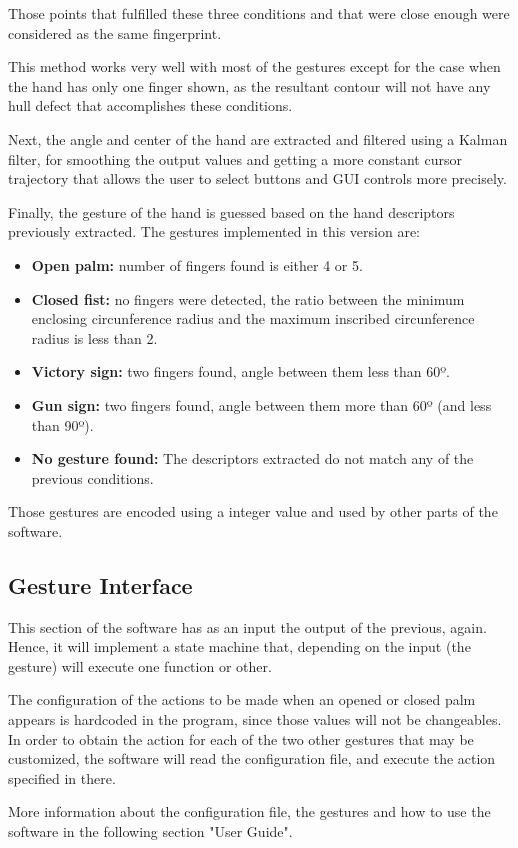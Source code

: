 Those points that fulfilled these three conditions and that were close enough were considered as the same fingerprint.

This method works very well with most of the gestures except for the case when the hand has only one finger shown, as the resultant contour will not have any hull defect that accomplishes these conditions.

Next, the angle and center of the hand are extracted and filtered using a Kalman filter, for smoothing the output values and getting a more constant cursor trajectory that allows the user to select buttons and GUI controls more precisely.

Finally, the gesture of the hand is guessed based on the hand descriptors previously extracted. The gestures implemented in this version are:

\begin{itemize}
\item {\bfseries Open palm:} number of fingers found is either 4 or 5.
\item {\bfseries Closed fist:} no fingers were detected, the ratio between the minimum enclosing circunference radius and the maximum inscribed circunference radius is less than 2.
\item {\bfseries Victory sign:} two fingers found, angle between them less than 60º.
\item {\bfseries Gun sign:} two fingers found, angle between them more than 60º (and less than 90º).
\item {\bfseries No gesture found:} The descriptors extracted do not match any of the previous conditions.
\end{itemize}

Those gestures are encoded using a integer value and used by other parts of the software.


\subsection{Gesture Interface} 
This section of the software has as an input the output of the previous, again. Hence, it will implement a state machine that, depending on the input (the gesture) will execute one function or other. 

\begin{center}
\end{center}

The configuration of the actions to be made when an opened or closed palm appears is hardcoded in the program, since those values will not be changeables. In order to obtain the action for each of the two other gestures that may be customized, the software will read the configuration file, and execute the action specified in there. 

More information about the configuration file, the gestures and how to use the software in the following section "User Guide". 

\newpage